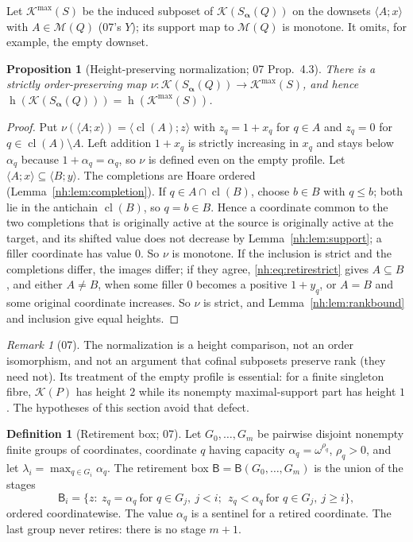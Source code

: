 \documentclass[11pt,a4paper]{article}
\newtheorem{proposition}[theorem]{Proposition}
\theoremstyle{definition}
\newtheorem{definition}[theorem]{Definition}
\theoremstyle{remark}
\newtheorem{remark}[theorem]{Remark}
\newcommand{\K}{\mathcal K}
\newcommand{\M}{\mathcal M}
\newcommand{\hgt}{\operatorname{h}}
\newcommand{\mcl}{\operatorname{cl}}
\newcommand{\Kmax}{\K^{\max}}
\begin{document}
Let $\Kmax(S)$ be the induced subposet of $\K(S_{\boldsymbol\alpha}(Q))$ on the
downsets $\langle A;x\rangle$ with $A\in\M(Q)$ (07's $Y$); its support map to
$\M(Q)$ is monotone. It omits, for example, the empty downset.

\begin{proposition}[Height-preserving normalization; 07 Prop.~4.3]
\label{nh:prop:normalization}
There is a strictly order-preserving map
$\nu:\K(S_{\boldsymbol\alpha}(Q))\to\Kmax(S)$, and hence
$\hgt(\K(S_{\boldsymbol\alpha}(Q)))=\hgt(\Kmax(S))$.
\end{proposition}
\begin{proof}
Put $\nu(\langle A;x\rangle)=\langle\mcl(A);z\rangle$ with $z_q=1+x_q$ for $q\in A$
and $z_q=0$ for $q\in\mcl(A)\setminus A$. Left addition $1+x_q$ is strictly
increasing in $x_q$ and stays below $\alpha_q$ because $1+\alpha_q=\alpha_q$, so
$\nu$ is defined even on the empty profile. Let
$\langle A;x\rangle\subseteq\langle B;y\rangle$. The completions are Hoare
ordered (Lemma~\ref{nh:lem:completion}). If $q\in A\cap\mcl(B)$, choose $b\in B$
with $q\le b$; both lie in the antichain $\mcl(B)$, so $q=b\in B$. Hence a
coordinate common to the two completions that is originally active at the
source is originally active at the target, and its shifted value does not
decrease by Lemma~\ref{nh:lem:support}; a filler coordinate has value $0$. So
$\nu$ is monotone. If the inclusion is strict and the completions differ, the
images differ; if they agree, \eqref{nh:eq:retirestrict} gives $A\subseteq B$,
and either $A\ne B$, when some filler $0$ becomes a positive $1+y_q$, or $A=B$
and some original coordinate increases. So $\nu$ is strict, and
Lemma~\ref{nh:lem:rankbound} and inclusion give equal heights.
\end{proof}

\begin{remark}[07]
The normalization is a height comparison, not an order isomorphism, and not an
argument that cofinal subposets preserve rank (they need not). Its treatment of
the empty profile is essential: for a finite singleton fibre, $\K(P)$ has
height $2$ while its nonempty maximal-support part has height $1$. The
hypotheses of this section avoid that defect.
\end{remark}

\begin{definition}[Retirement box; 07]
Let $G_0,\dots,G_m$ be pairwise disjoint nonempty finite groups of coordinates,
coordinate $q$ having capacity $\alpha_q=\omega^{\rho_q}$, $\rho_q>0$, and let
$\lambda_i=\max_{q\in G_i}\alpha_q$. The retirement box
$\mathsf B=\mathsf B(G_0,\dots,G_m)$ is the union of the stages
\[
 \mathsf B_i=\bigl\{z:\ z_q=\alpha_q\ \text{for }q\in G_j,\ j<i;\ \
 z_q<\alpha_q\ \text{for }q\in G_j,\ j\ge i\bigr\},
\]
ordered coordinatewise. The value $\alpha_q$ is a sentinel for a retired
coordinate. The last group never retires: there is no stage $m+1$.
\end{definition}
\end{document}
